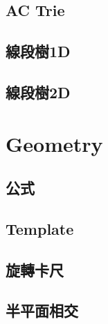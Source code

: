     \subsection{AC Trie}
    \subsection{線段樹1D}
    \subsection{線段樹2D}
        
\section{Geometry}
    \subsection{公式}
        
    \subsection{Template}
        
    \subsection{旋轉卡尺}
        
    \subsection{半平面相交}
        
